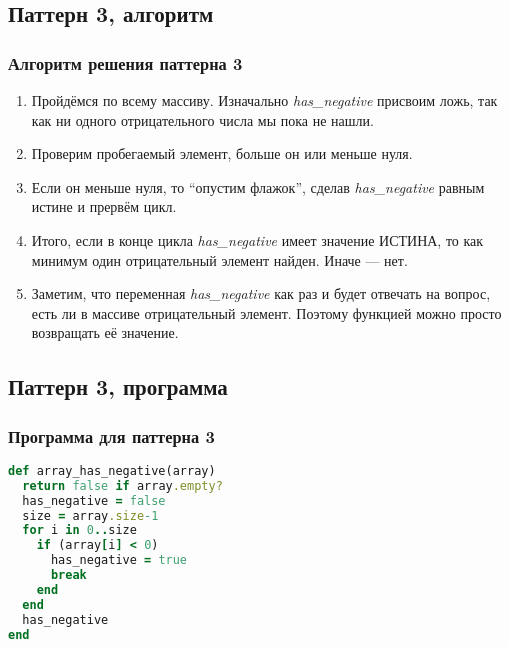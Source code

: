 \documentclass[compress,red]{beamer}
\begin{document}
\subsection{Паттерн 3, алгоритм}
\begin{frame}[fragile]
\frametitle{Алгоритм решения паттерна 3}
		\begin{enumerate}
			\item Пройдёмся по всему массиву. Изначально \emph{has\_negative} присвоим ложь, так как ни одного отрицательного числа мы пока не нашли.
			\item Проверим пробегаемый элемент, больше он или меньше нуля.
			\item Если он меньше нуля, то ``опустим флажок'', сделав \emph{has\_negative} равным истине и прервём цикл.
			\item Итого, если в конце цикла \emph{has\_negative} имеет значение ИСТИНА, то как минимум один отрицательный элемент найден. Иначе --- нет.
			\item Заметим, что переменная \emph{has\_negative} как раз и будет отвечать на вопрос, есть ли в массиве отрицательный элемент. Поэтому функцией можно просто возвращать её значение.
		\end{enumerate}
\end{frame}

\subsection{Паттерн 3, программа}
\begin{frame}[fragile]
\frametitle{Программа для паттерна 3}
		\scriptsize{
	  \begin{lstlisting}[label=ruby5,language=Ruby,caption=Паттерн 3]
def array_has_negative(array)
  return false if array.empty?
  has_negative = false
  size = array.size-1
  for i in 0..size
    if (array[i] < 0)
      has_negative = true
      break
    end
  end
  has_negative
end
	  \end{lstlisting}
		}
\end{frame}
\end{document}

